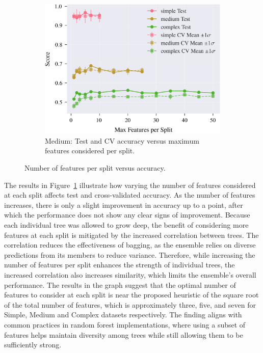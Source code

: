 \documentclass[conference]{IEEEtran}
\begin{document}
\begin{figure}[H]
  \centering
  \begin{subfigure}[b]{\columnwidth}
    \centering
    \includegraphics[width=\linewidth]{images/all_datasets_accuracy_vs_features.png}
    \caption{Medium: Test and CV accuracy versus maximum features considered per split.}
    \label{fig:exp2-medium-acc}
  \end{subfigure}
  \caption{Number of features per split versus accuracy.}
  \label{fig:exp2-accuracy-features}
\end{figure}

The results in Figure~\ref{fig:exp2-medium-acc} illustrate how varying the number of features considered at each split affects test and cross-validated accuracy. As the number of features increases, there is only a slight improvement in accuracy up to a point, after which the performance does not show any clear signs of improvement. Because each individual tree was allowed to grow deep, the benefit of considering more features at each split is mitigated by the increased correlation between trees. The correlation reduces the effectiveness of bagging, as the ensemble relies on diverse predictions from its members to reduce variance. Therefore, while increasing the number of features per split enhances the strength of individual trees, the increased correlation also increases similarity, which limits the ensemble's overall performance. The results in the graph suggest that the optimal number of features to consider at each split is near the proposed heuristic of the square root of the total number of features, which is approximately three, five, and seven for Simple, Medium and Complex datasets respectively. The finding aligns with common practices in random forest implementations, where using a subset of features helps maintain diversity among trees while still allowing them to be sufficiently strong.
\end{document}
